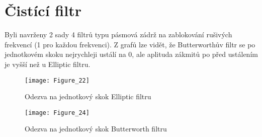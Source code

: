 \section{Čistící filtr}

Byli navrženy 2 sady 4 filtrů typu pásmová zádrž na zablokování rušivých frekvencí (1 pro každou frekvenci).
Z grafů lze vidět, že Butterworthův filtr se po jednotkovém skoku nejrychleji ustálí na 0, ale aplituda zákmitů po před ustálením je vyšší než u Elliptic filtru.

\begin{figure}[H] 
	\centering
	\texttt{[image: Figure\_22]}
	\caption{Odezva na jednotkový skok Elliptic filtru}
\end{figure}

\begin{figure}[H] 
	\centering
	\texttt{[image: Figure\_24]}
	\caption{Odezva na jednotkový skok Butterworth filtru}
\end{figure}